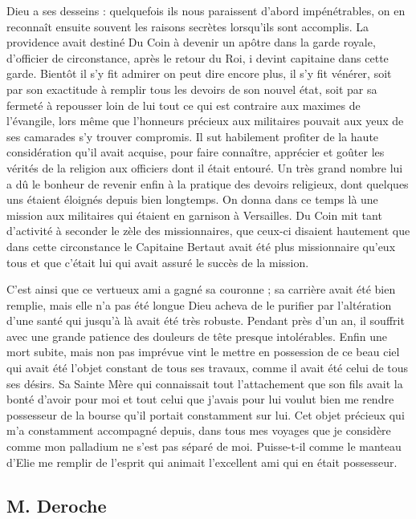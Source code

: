 \documentclass[11pt,a4paper]{report}
\begin{document}
Dieu a ses desseins : quelquefois ils nous paraissent d'abord impénétrables, on en reconnaît ensuite souvent les raisons secrètes lorsqu'ils sont accomplis. La providence avait destiné Du Coin à devenir un apôtre dans la garde royale, d'officier de circonstance, après le retour du Roi, i devint capitaine dans cette garde. Bientôt il s'y fit admirer on peut dire encore plus, il s'y fit vénérer, soit par son exactitude à remplir tous les devoirs de son nouvel état, soit par sa fermeté à repousser loin de lui tout ce qui est contraire aux maximes de l'évangile, lors même que l'honneurs précieux aux militaires pouvait aux yeux de ses camarades s'y trouver compromis. Il sut habilement profiter de la haute considération qu'il avait acquise, pour faire connaître, apprécier et goûter les vérités de la religion aux officiers dont il était entouré. Un très grand nombre lui a dû le bonheur de revenir enfin à la pratique des devoirs religieux, dont quelques uns étaient éloignés depuis bien longtemps. On donna dans ce temps là une mission aux militaires qui étaient en garnison à Versailles. Du Coin mit tant d'activité à seconder le zèle des missionnaires, que ceux-ci disaient hautement que dans cette circonstance le Capitaine Bertaut avait été plus missionnaire qu'eux tous et que c'était lui qui avait assuré le succès de la mission.

C'est ainsi que ce vertueux ami a gagné sa couronne ; sa carrière avait été bien remplie, mais elle n'a pas été longue Dieu acheva de le purifier par l'altération d'une santé qui jusqu'à là avait été très robuste. Pendant près d'un an, il souffrit avec une grande patience des douleurs de tête presque intolérables. Enfin une mort subite, mais non pas imprévue vint le mettre en possession de ce beau ciel qui avait été l'objet constant de tous ses travaux, comme il avait été celui de tous ses désirs. Sa Sainte Mère qui connaissait tout l'attachement que son fils avait la bonté d'avoir pour moi et tout celui que j'avais pour lui voulut bien me rendre possesseur de la bourse qu'il portait constamment sur lui. Cet objet précieux qui m'a constamment accompagné depuis, dans tous mes voyages que je considère comme mon palladium ne s'est pas séparé de moi. Puisse-t-il comme le manteau d'Elie me remplir de l'esprit qui animait l'excellent ami qui en était possesseur.

\subsection*{M. Deroche}
\end{document}
